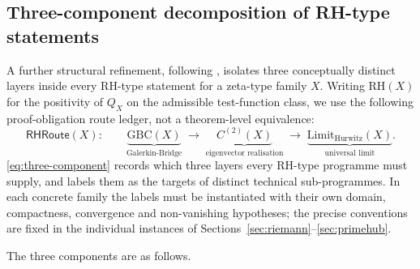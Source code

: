 \documentclass[11pt]{article}
\theoremstyle{definition}
\theoremstyle{remark}
\begin{document}
\subsection{Three-component decomposition of RH-type statements}
\label{sec:three-component}

A further structural refinement, following
\cite{MetaGalerkinBridge}, isolates three conceptually distinct
layers inside every RH-type statement for a zeta-type family $X$.
Writing $\mathrm{RH}(X)$ for the positivity of $Q_X$ on the
admissible test-function class, we use the following proof-obligation
route ledger, not a theorem-level equivalence:
\begin{equation}
\label{eq:three-component}
  \mathsf{RHRoute}(X):\qquad
  \underbrace{\mathrm{GBC}(X)}_{\text{Galerkin-Bridge}}
  \;\longrightarrow\;
  \underbrace{C^{(2)}(X)}_{\text{eigenvector realisation}}
  \;\longrightarrow\;
  \underbrace{\mathrm{Limit}_{\mathrm{Hurwitz}}(X)}_{\text{universal limit}}.
\end{equation}
\eqref{eq:three-component} records which three layers every RH-type
programme must supply, and labels them as the targets of distinct
technical sub-programmes. In each concrete family the labels must be
instantiated with their own domain, compactness, convergence and
non-vanishing hypotheses; the precise conventions are fixed in the
individual instances of Sections~\ref{sec:riemann}--\ref{sec:primehub}.

The three components are as follows.
\end{document}
